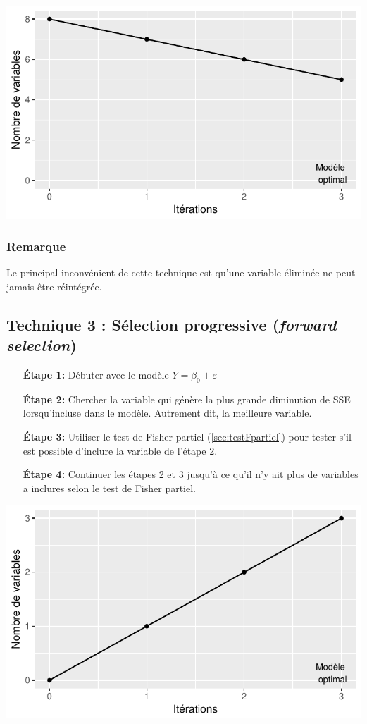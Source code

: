 \documentclass[11pt,french]{report}
\begin{document}
\includegraphics{notes_de_cours-025}

\subsubsection*{Remarque}
Le principal inconvénient de cette technique est qu'une variable éliminée ne peut jamais être réintégrée. 

\subsection{Technique 3 : Sélection progressive (\emph{forward selection})}
\label{tech3}

\begin{itemize}
\item [\textbf{Étape 1:}] Débuter avec le modèle $Y = \beta_0 + \varepsilon$

\item [\textbf{Étape 2:}] Chercher la variable qui génère la plus grande diminution de SSE lorsqu'incluse dans le modèle. Autrement dit, la meilleure variable.

\item [\textbf{Étape 3:}] Utiliser le test de Fisher partiel (\ref{sec:testFpartiel}) pour tester s'il est possible d'inclure la variable de l'étape 2.

\item [\textbf{Étape 4:}] Continuer les étapes 2 et 3 jusqu'à ce qu'il n'y ait plus de variables a inclures selon le test de Fisher partiel.
\end{itemize}
\bigskip

\includegraphics{notes_de_cours-026}
\end{document}
